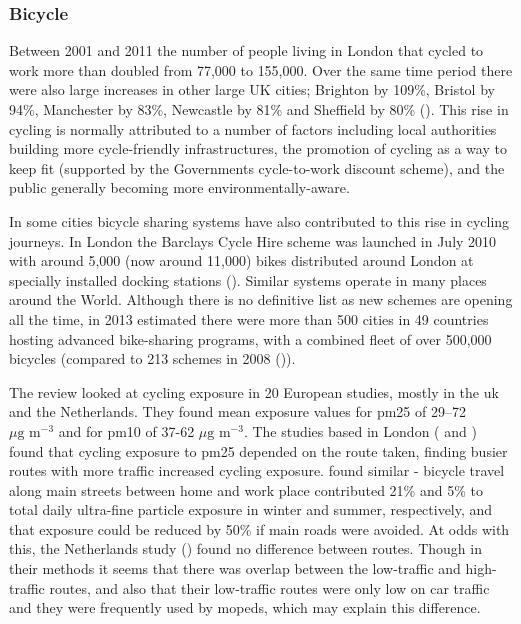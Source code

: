 
\subsubsection{Bicycle}
\label{sec:bicycle}

Between 2001 and 2011 the number of people living in London that cycled to work more than doubled from 77,000 to 155,000. Over the same time period there were also large increases in other large UK cities; Brighton by 109\%, Bristol by 94\%, Manchester by 83\%, Newcastle by 81\% and Sheffield by 80\% (\cite{OfficeforNationalStatistics2014}). This rise in cycling is normally attributed to a number of factors including local authorities building more cycle-friendly infrastructures, the promotion of cycling as a way to keep fit (supported by the Governments cycle-to-work discount scheme), and the public generally becoming more environmentally-aware. 

In some cities bicycle sharing systems have also contributed to this rise in cycling journeys. In London the Barclays Cycle Hire scheme was launched in July 2010 with around 5,000 (now around 11,000) bikes distributed around London at specially installed docking stations (\cite{TransportforLondon2014}). Similar systems operate in many places around the World. Although there is no definitive list as new schemes are opening all the time, in 2013 \cite{larsen2013bike} estimated there were more than 500 cities in 49 countries hosting advanced bike-sharing programs, with a combined fleet of over 500,000 bicycles (compared to 213 schemes in 2008 (\cite{Wikipedia2014})).

The \cite{Karanasiou2014} review looked at cycling exposure in 20 European studies, mostly in the \gls{uk} and the Netherlands. They found mean exposure values for \gls{pm25} of 29--72 $\mu \text{g m}^{-3}$ and for \gls{pm10} of 37-62 $\mu \text{g m}^{-3}$. The studies based in London (\cite{Kaur2005} and \cite{Adams2001}) found that cycling exposure to \gls{pm25} depended on the route taken, finding busier routes with more traffic increased cycling exposure. \cite{Ragettli2013} found similar - bicycle travel along main streets between home and work place contributed 21\% and 5\% to total daily ultra-fine particle exposure in winter and summer, respectively, and that exposure could be reduced by 50\% if main roads were avoided. At odds with this, the Netherlands study (\cite{Zuurbier2010}) found no difference between routes. Though in their methods it seems that there was overlap between the low-traffic and high-traffic routes, and also that their low-traffic routes were only low on car traffic and they were frequently used by mopeds, which may explain this difference.

